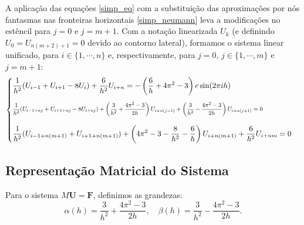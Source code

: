 \documentclass[12pt, a4paper]{article}
\begin{document}
    A aplicação das equações \eqref{simp_eq} com a substituição das aproximações por nós fantasmas nas fronteiras horizontais \eqref{simp_neumann} leva a modificações no estêncil para $j=0$ e $j=m+1$. Com a notação linearizada $U_k$ (e definindo $U_0 = U_{n(m+2)+1} = 0$ devido ao contorno lateral), formamos o sistema linear unificado, para $i \in \{1,\cdots,n\}$ e, respectivamente, para $j=0$, $j \in \{1,\cdots,m\}$ e $j=m+1$:
    \begin{equation}
    \begin{cases}
        \displaystyle \frac{1}{h^2}(U_{i-1} + U_{i+1} - 8 U_{i}) + \frac{6}{h^2} U_{i+n} = -\left(\frac{6}{h} + 4\pi^2 -3\right)e\sin(2\pi ih)\\[.5cm]
        \resizebox{0.95\textwidth}{!}{$\displaystyle \frac{1}{h^2}(U_{i-1+nj} + U_{i+1+nj} - 8 U_{i+nj}) + \left(\frac{3}{h^2} + \frac{4\pi^2 -3}{2h}\right)U_{i+n(j-1)} + \left(\frac{3}{h^2} - \frac{4\pi^2 -3}{2h}\right) U_{i+n(j+1)} = 0$}\\[.5cm]
        \displaystyle \frac{1}{h^2}(U_{i-1+n(m+1)} + U_{i+1+n(m+1)}) + \left(4\pi^2 -3 -\frac{8}{h^2} - \frac{6}{h}\right)U_{i+n(m+1)} + \frac{6}{h^2} U_{i+nm} = 0
    \end{cases}
    \end{equation}

    \subsection{Representação Matricial do Sistema}

    Para o sistema $M \mathbf{U} = \mathbf{F}$, definimos as grandezas:
    \[\alpha(h) = \frac{3}{h^2}+\frac{4\pi^2 - 3}{2h},\quad \beta(h) = \frac{3}{h^2}-\frac{4\pi^2 - 3}{2h}.\]
\end{document}
